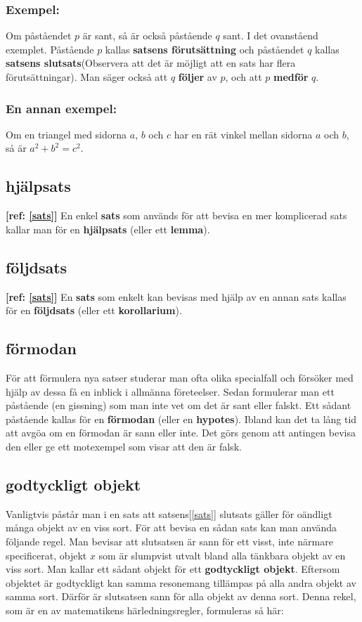     \subsubsection{Exempel:}
        Om påståendet $p$ är sant, så är också påstående $q$ sant.
    \newline \hfill \break I det ovanståend exemplet. Påstående $p$ kallas \textbf{satsens förutsättning} och påståendet $q$ kallas \textbf{satsens slutsats}(Observera att det är möjligt att en sats har flera förutsättningar). Man säger också att $q$ \textbf{följer} av $p$, och att $p$ \textbf{medför} $q$.
    \subsubsection{En annan exempel:}
        Om en triangel med sidorna $a$, $b$ och $c$ har en rät vinkel mellan sidorna $a$ och $b$, så är $a^2+b^2=c^2$.
\subsection{hjälpsats}\label{hjälpsats}
    \textbf{[ref: \ref{sats}]} En enkel \textbf{sats} som används för att bevisa en mer komplicerad sats kallar man för en \textbf{hjälpsats} (eller ett \textbf{lemma}).
\subsection{följdsats}\label{följdsats}
    \textbf{[ref: \ref{sats}]} En \textbf{sats} som enkelt kan bevisas med hjälp av en annan sats kallas för en \textbf{följdsats} (eller ett \textbf{korollarium}).
\subsection{förmodan}\label{förmodan}
    \textbf{\cite{förmodan}} För att förmulera nya satser studerar man ofta olika specialfall och försöker med hjälp av dessa få en inblick i allmänna företeelser. Sedan formulerar man ett påstående (en gissning) som man inte vet om det är sant eller falskt. Ett sådant påstående kallas för en \textbf{förmodan} (eller en \textbf{hypotes}). Ibland kan det ta lång tid att avgöa om en förmodan är sann eller inte. Det görs genom att antingen bevisa den eller ge ett motexempel som visar att den är falsk.
\subsection{godtyckligt objekt}\label{godtyckligt-objekt}
    \textbf{\cite{godtyckligt-objekt}} Vanligtvis påstår man i en sats att satsens[\ref{sats}] slutsats gäller för oändligt många objekt av en viss sort. För att bevisa en sådan sats kan man använda följande regel. Man bevisar att slutsatsen är sann för ett visst, inte närmare specificerat, objekt $x$ som är slumpvist utvalt bland alla tänkbara objekt av en viss sort. Man kallar ett sådant objekt för ett \textbf{godtyckligt objekt}. Eftersom objektet är godtyckligt kan samma resonemang tillämpas på alla andra objekt av samma sort. Därför är slutsatsen sann för alla objekt av denna sort. Denna rekel, som är en av matematikens härledningsregler, formuleras så här: 
